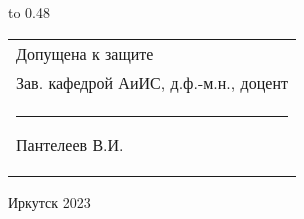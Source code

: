 \vspace{0.8cm}

{
	\noindent\hbox to 0.48\textwidth {%
		\mbox{ } \hfil} %
	\begin{tabular}[t]{l}
		Допущена к защите\\
		Зав. кафедрой АиИС, д.ф.-м.н., доцент \\
		\rule{2.7cm}{0.5pt} Пантелеев В.И.
	\end{tabular}		
}

\vspace{0.8cm}

\vfill 
\noindent
\begin{minipage}{\textwidth}
\centering	 Иркутск 2023
\end{minipage}